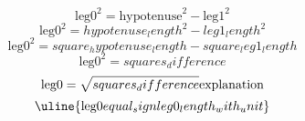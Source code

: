 \[\text{{{leg0}}}^{{2}}=\text{{{hypotenuse}}}^{{2}}-\text{{{leg1}}}^{{2}}\]
\[\text{{{leg0}}}^{{2}}={hypotenuse_length}^{{2}}-{leg1_length}^{{2}}\]
\[\text{{{leg0}}}^{{2}}={square_hypotenuse_length}-{square_leg1_length}\]
\[\text{{{leg0}}}^{{2}}={squares_difference}\]
\[\text{{{leg0}}}=\sqrt{{\mathstrut {squares_difference}}}\text{{{explanation}}}\]
\[\uline{{\text{{{leg0}}}{equal_sign}{leg0_length_with_unit}}}\]